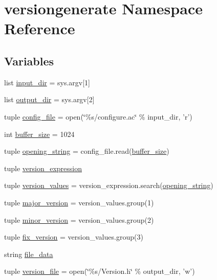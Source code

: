 \hypertarget{namespaceversiongenerate}{\section{versiongenerate Namespace Reference}
\label{namespaceversiongenerate}
}
\subsection*{Variables}
\begin{DoxyCompactItemize}
\item 
list \hyperlink{namespaceversiongenerate_a035dbc8bc18034df9f39d74ef7b63f04}{input\-\_\-dir} = sys.\-argv\mbox{[}1\mbox{]}
\item 
list \hyperlink{namespaceversiongenerate_a66aeb3b9df50fe61aa16e436b75f5a9a}{output\-\_\-dir} = sys.\-argv\mbox{[}2\mbox{]}
\item 
tuple \hyperlink{namespaceversiongenerate_a83593153f3d0b56342efa807726b5d39}{config\-\_\-file} = open(\char`\"{}\%s/configure.\-ac\char`\"{} \% input\-\_\-dir, 'r')
\item 
int \hyperlink{namespaceversiongenerate_a5656c48d43f7e869041b6a30c124702e}{buffer\-\_\-size} = 1024
\item 
tuple \hyperlink{namespaceversiongenerate_a6adb70bc03a954c71bcf964a1cb51523}{opening\-\_\-string} = config\-\_\-file.\-read(\hyperlink{namespaceversiongenerate_a5656c48d43f7e869041b6a30c124702e}{buffer\-\_\-size})
\item 
tuple \hyperlink{namespaceversiongenerate_a7f509e15e9ef2fe82d5fad077a0f901c}{version\-\_\-expression}
\item 
tuple \hyperlink{namespaceversiongenerate_aec88e2b4a2964885f9e88c055cc0cf69}{version\-\_\-values} = version\-\_\-expression.\-search(\hyperlink{namespaceversiongenerate_a6adb70bc03a954c71bcf964a1cb51523}{opening\-\_\-string})
\item 
tuple \hyperlink{namespaceversiongenerate_a792a7f9df0084617e1ddaf10548bbaf8}{major\-\_\-version} = version\-\_\-values.\-group(1)
\item 
tuple \hyperlink{namespaceversiongenerate_a09b0aa308f4f63c03e547bac116061f1}{minor\-\_\-version} = version\-\_\-values.\-group(2)
\item 
tuple \hyperlink{namespaceversiongenerate_a409471f03e765e6658400941518fde18}{fix\-\_\-version} = version\-\_\-values.\-group(3)
\item 
string \hyperlink{namespaceversiongenerate_aa7a8a587902d8dc493945992ec3fcf60}{file\-\_\-data}
\item 
tuple \hyperlink{namespaceversiongenerate_af3ac1aa2af0e761691fdda9a58f461a4}{version\-\_\-file} = open(\char`\"{}\%s/Version.\-h\char`\"{} \% output\-\_\-dir, 'w')
\end{DoxyCompactItemize}


